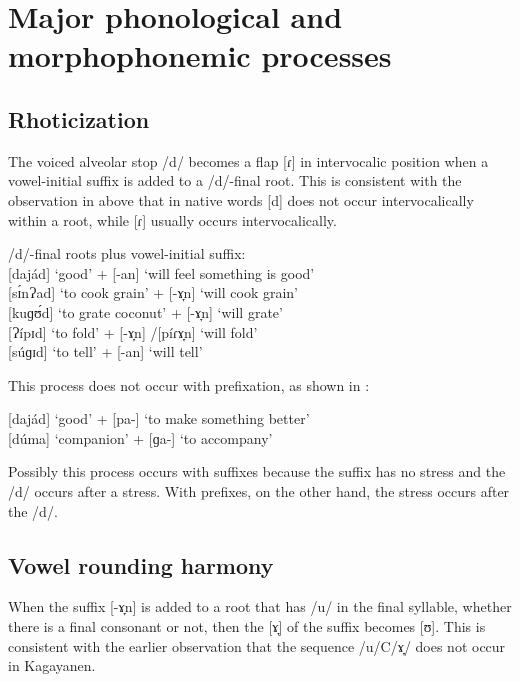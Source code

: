 \section{Major phonological and morphophonemic processes}
\label{bkm:Ref360478227}
\subsection{Rhoticization}\label{sec:rhoticization}
The voiced alveolar stop /d/ becomes a flap [ɾ] in intervocalic position when a vowel-initial suffix is added to a /d/-final root. This is consistent with the observation in  above that in native words [d] does not occur intervocalically within a root, while [ɾ] usually occurs intervocalically.



\ea
/d/-final roots plus vowel-initial suffix: \\
{}[dajád] ‘good’ + [-an] \rightarrow [dajáɾan] ‘will feel something is good’ \\
{}[sɪ́nɁad] ‘to cook grain’ + [-ɤ̞n] \rightarrow [sɪnɁáɾɤ̞n] ‘will cook grain’ \\
{}[kuɡʊ́d] ‘to grate coconut’ + [-ɤ̞n] \rightarrow [kuɡúɾʊn] ‘will grate’ \\
{}[Ɂípɪd] ‘to fold’ + [-ɤ̞n] \rightarrow [Ɂipíɾɤ̞n]/[píɾɤ̞n] ‘will fold’ \\
{}[súɡɪd] ‘to tell’ + [-an] \rightarrow [suɡíɾan] ‘will tell’
\z

This process does not occur with prefixation, as shown in :

\ea
\label{ex:better}
{}[dajád] ‘good’ + [pa-] \rightarrow [pàdajád] ‘to make something better’ \\
{}[dúma] ‘companion’ + [ɡa-] \rightarrow [ɡadúma] ‘to accompany’
\z

Possibly this process occurs with suffixes because the suffix has no stress and the /d/ occurs after a stress. With prefixes, on the other hand, the stress occurs after the /d/. 

\subsection{Vowel rounding harmony}\label{vowel-harmony}
When the suffix [-ɤ̞n] is added to a root that has /u/ in the final syllable, whether there is a final consonant or not, then the [ɤ̞] of the suffix becomes [ʊ]. This is consistent with the earlier observation that the sequence /u/C/ɤ̞/ does not occur in Kagayanen.


